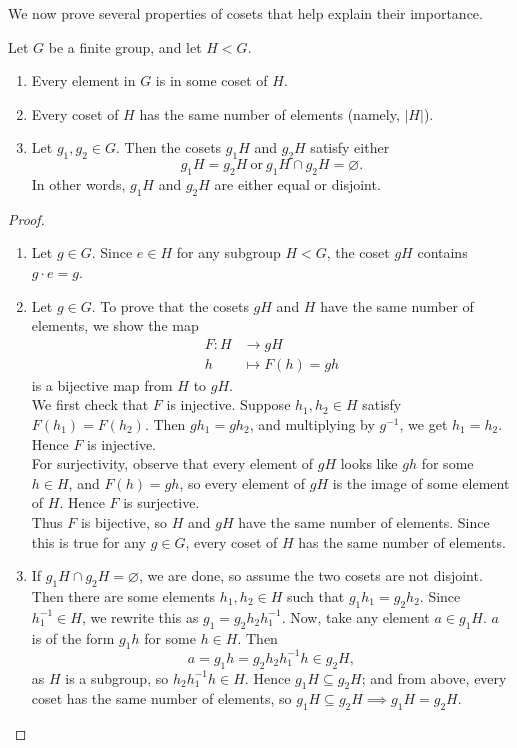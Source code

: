\documentclass[math1530-lecture-notes]{subfiles}
\begin{document}
We now prove several properties of cosets that help explain their importance.
\begin{proposition}{}
  Let $G$ be a finite group, and let $H<G$.
  \begin{enumerate}
    \item Every element in $G$ is in some coset of $H$.
    \item Every coset of $H$ has the same number of elements (namely, $\left| H \right| $).
    \item Let $g_1,g_2\in G$. Then the cosets $g_1H$ and $ g_2H$ satisfy either \[
      g_1H=g_2H ~\text{or}~g_1H\cap g_2H=\varnothing
    .\] In other words, $g_1H$ and $g_2H$ are either equal or disjoint.
  \end{enumerate}
\end{proposition}
\begin{proof}[Proof]
  \begin{enumerate}
    \item Let $g\in G$. Since $e\in H$ for any subgroup $H<G$, the coset $gH$ contains $g\cdot e=g$.
    \item Let $g\in G$. To prove that the cosets $gH$ and $H$ have the same number of elements, we
      show the map \begin{align*}
        F: H &\longrightarrow gH \\
        h &\longmapsto F(h) = gh
      \end{align*}
      is a bijective map from $H$ to $gH$.\\
      We first check that $F$ is injective. Suppose $h_1,h_2\in H$ satisfy $F(h_1)=F(h_2)$. Then
      $gh_1=gh_2$, and multiplying by $g^{-1}$, we get $h_1=h_2$. Hence $F$ is injective.\\
      For surjectivity, observe that every element of $gH$ looks like $gh$ for some $h\in H$, and
      $F(h)=gh$, so every element of $gH$ is the image of some element of $H$. Hence $F$ is
      surjective.\\
      Thus $F$ is bijective, so $H$ and $gH$ have the same number of elements. Since this is true
      for any $g\in G$, every coset of $H$ has the same number of elements.
    \item If $g_1H\cap g_2H=\varnothing$, we are done, so assume the two cosets are not disjoint.
      Then there are some elements $h_1,h_2\in H$ such that $g_1h_1=g_2h_2$. Since $h_1^{-1}\in H$,
      we rewrite this as $ g_1=g_2h_2h_1^{-1}$. Now, take any element $a\in g_1H$. $a$ is of the
      form $g_1h$ for some $h\in H$. Then \[
        a = g_1h = g_2h_2h_1^{-1}h \in g_2H
      ,\] as $H$ is a subgroup, so $h_2h_1^{-1}h\in H$. Hence $g_1H\subseteq g_2H$; and from above,
      every coset has the same number of elements, so $ g_1H\subseteq g_2H \implies g_1H=g_2H$.
  \end{enumerate}
\end{proof}
\end{document}
